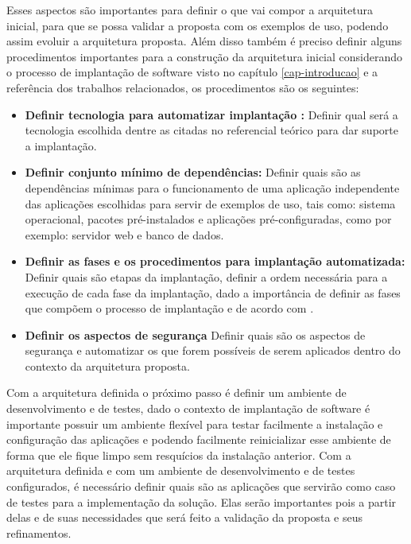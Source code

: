 Esses aspectos são importantes para definir o que vai compor a arquitetura inicial,
para que se possa validar a proposta com os exemplos de uso,
podendo assim evoluir a arquitetura proposta. Além disso também é preciso definir
alguns procedimentos importantes para a construção da arquitetura inicial
considerando o processo de implantação de software visto no
capítulo \ref{cap-introducao} e a referência dos trabalhos relacionados, os procedimentos
são os seguintes:

\begin{itemize}
  \item  \textbf{Definir tecnologia para automatizar implantação :}  Definir qual será a
  tecnologia escolhida dentre as citadas no referencial teórico para dar suporte
  a implantação.
  \item  \textbf{Definir conjunto mínimo de dependências:} Definir quais são as dependências
  mínimas para o funcionamento de uma aplicação independente das aplicações escolhidas para
  servir de exemplos de uso, tais como: sistema operacional, pacotes pré-instalados
  e aplicações pré-configuradas, como por exemplo: servidor web e banco de dados.
  \item  \textbf{Definir as fases e os procedimentos para implantação automatizada:}
   Definir quais são etapas da implantação, definir a ordem necessária para a execução de
  cada fase da implantação, dado a importância de definir as fases que compõem o processo de
  implantação e de acordo com \cite{omg2006}.
  \item  \textbf{Definir os aspectos de segurança} Definir quais são os aspectos de segurança
  e automatizar os que forem possíveis de serem aplicados dentro do contexto da arquitetura
  proposta.
\end{itemize}

Com a arquitetura definida o próximo passo é definir um ambiente de desenvolvimento e de
testes, dado o contexto de implantação de software é importante possuir um ambiente flexível para
testar facilmente a instalação e configuração das aplicações e podendo facilmente
reinicializar esse ambiente de forma que ele fique limpo sem resquícios da instalação
anterior. Com a arquitetura definida e com um ambiente de desenvolvimento e de testes configurados, é
necessário definir quais são as aplicações que servirão como caso de testes
para a implementação da solução. Elas serão importantes pois a partir delas
e de suas necessidades que será feito a validação da proposta e seus refinamentos.

